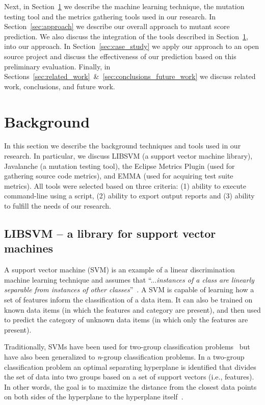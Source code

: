 \documentclass[10pt,conference,compsocconf]{IEEEtran}
\begin{document}
Next, in Section~\ref{sec:background} we describe the machine learning technique, the mutation testing tool and the metrics gathering tools used in our research. In Section~\ref{sec:approach} we describe our overall approach to mutant score prediction. We also discuss the integration of the tools described in Section~\ref{sec:background}, into our approach. In Section~\ref{sec:case_study} we apply our approach to an open source project and discuss the effectiveness of our prediction based on this preliminary evaluation. Finally, in Sections~\ref{sec:related_work}~\&~\ref{sec:conclusions_future_work} we discuss related work, conclusions, and future work.


\section{Background}
\label{sec:background}
In this section we describe the background techniques and tools used in our research. In particular, we discuss LIBSVM (a support vector machine library), Javalanche (a mutation testing tool), the Eclipse Metrics Plugin (used for gathering source code metrics), and EMMA (used for acquiring test suite metrics). All tools were selected based on three criteria: (1) ability to execute command-line using a script, (2) ability to export output reports and (3) ability to fulfill the needs of our research.


\subsection{LIBSVM -- a library for support vector machines}
\label{subsec:libsvm}
A support vector machine (SVM) is an example of a linear discrimination machine learning technique and assumes that ``...\emph{instances of a class are linearly separable from instances of other classes}''~\cite{ALP04}. A SVM is capable of learning how a set of features inform the classification of a data item. It can also be trained on known data items (in which the features and category are present), and then used to predict the category of  unknown data items (in which only the features are present).

Traditionally, SVMs have been used for two-group classification problems~\cite{CV95} but have also been generalized to \emph{n}-group classification problems. In a two-group classification problem an optimal separating hyperplane is identified that divides the set of data into two groups based on a set of support vectors (i.e., features). In other words, the goal is to maximize the distance from the closest data points on both sides of the hyperplane to the hyperplane itself~\cite{ALP04}.
\end{document}
